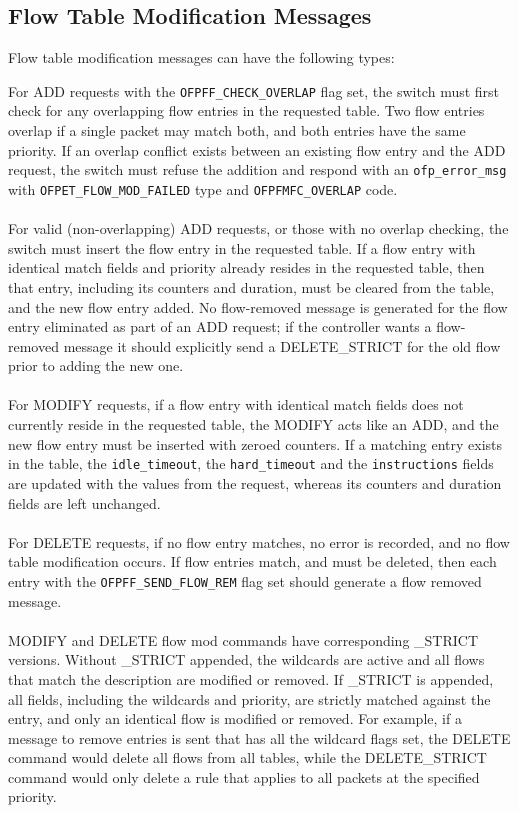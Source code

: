 \documentclass[10pt]{article}
\begin{document}
\subsection{Flow Table Modification Messages}
\label{sec:flow mod messages}
\label{flow_table:sec_chan:flow_add}
\label{flow_table:sec_chan:flow_mod}
\label{flow_table:sec_chan:flow_removal}
Flow table modification messages can have the following types:

For ADD requests with the \verb|OFPFF_CHECK_OVERLAP| flag set, the switch must first check for any overlapping flow entries in the requested table.  Two flow entries overlap if a single packet may match both, and both entries have the same priority.  If an overlap conflict exists between an existing flow entry and the ADD request, the switch must refuse the addition and respond with an \verb|ofp_error_msg| with \verb|OFPET_FLOW_MOD_FAILED| type and \verb|OFPFMFC_OVERLAP| code.
\\\\
For valid (non-overlapping) ADD requests, or those with no overlap checking, the switch must insert the flow entry in the requested table.  If a flow entry with identical match fields and priority already resides in the requested table, then that entry, including its counters and duration, must be cleared from the table, and the new flow entry added. No flow-removed message is generated for the flow entry eliminated as part of an ADD request; if the controller wants a flow-removed message it should explicitly send a DELETE\_STRICT for the old flow prior to adding the new one.
\\\\
For MODIFY requests, if a flow entry with identical match fields does not currently reside in the requested table, the MODIFY acts like an ADD, and the new flow entry must be inserted with zeroed counters.  If a matching entry exists in the table, the \verb|idle_timeout|, the \verb|hard_timeout| and the \verb|instructions| fields are updated with the values from the request, whereas its counters and duration fields are left unchanged.
\\\\
For DELETE requests, if no flow entry matches, no error is recorded, and no flow table modification occurs.  If flow entries match, and must be deleted, then each entry with the \verb|OFPFF_SEND_FLOW_REM| flag set should generate a flow removed message.
\\\\
MODIFY and DELETE flow mod commands have corresponding \_STRICT versions.   Without \_STRICT appended, the wildcards are active and all flows that match the description are modified or removed.  If \_STRICT is appended, all fields, including the wildcards and priority, are strictly matched against the entry, and only an identical flow is modified or removed.  For example, if a message to remove entries is sent that has all the wildcard flags set, the DELETE command would delete all flows from all tables, while the DELETE\_STRICT command would only delete a rule that applies to all packets at the specified priority.
\end{document}
